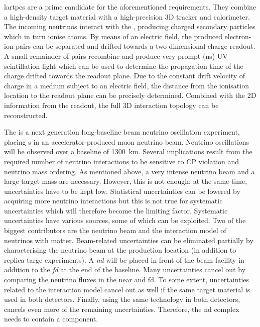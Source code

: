 \glspl{lartpc} are a prime candidate for the aforementioned requirements.
They combine a high-density target material with a high-precision 3D tracker and calorimeter.
The incoming neutrinos interact with the \lar{}, producing charged secondary particles which in turn ionise  atoms.
By means of an electric field, the produced electron-ion pairs can be separated and drifted towards a two-dimensional charge readout.
A small remainder of pairs recombine and produce very prompt (\si{\nano\second}) UV scintillation light which can be used to determine the propagation time of the charge drifted towards the readout plane.
Due to the constant drift velocity of charge in a medium subject to an electric field, the distance from the ionisation location to the readout plane can be precisely determined.
Combined with the 2D information from the readout, the full 3D interaction topology can be reconstructed.

The \dune{} is a next generation long-baseline beam neutrino oscillation experiment, placing \lartpc{}s in an accelerator-produced muon neutrino beam.
Neutrino oscillations will be observed over a baseline of \SI{1300}{\kilo\metre}.
Several implications result from the required number of neutrino interactions to be sensitive to CP violation and neutrino mass ordering.
As mentioned above, a very intense neutrino beam and a large target mass are necessary.
However, this is not enough; at the same time, uncertainties have to be kept low.
Statistical uncertainties can be lowered by acquiring more neutrino interactions but this is not true for systematic uncertainties which will therefore become the limiting factor.
Systematic uncertainties have various sources, some of which can be exploited.
Two of the biggest contributors are the neutrino beam and the interaction model of neutrinos with matter.
Beam-related uncertainties can be eliminated partially by characterising the neutrino beam at the production location (in addition to replica targe experiments).
A \emph{\gls{nd}} will be placed in front of the beam facility in addition to the \emph{\gls{fd}} at the end of the baseline.
Many uncertainties cancel out by comparing the neutrino fluxes in the near and \gls{fd}.
To some extent, uncertainties related to the interaction model cancel out as well if the same target material is used in both detectors.
Finally, using the same technology in both detectors, cancels even more of the remaining uncertainties.
Therefore, the \gls{nd} complex needs to contain a \lartpc{} component.

